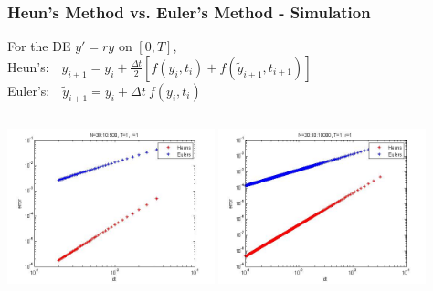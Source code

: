 \begin{frame}
   \frametitle{Heun's Method vs. Euler's Method - Simulation}
For the DE $y'=r y$ on $[0,T]$,\\
\vspace{1em}
		\hspace{1.5em} Heun's:$ \hspace{1em} y_{i+1} = y_i + \frac{\Delta t}{2} \left[f(y_i,t_i) + f(\tilde{y}_{i+1}, t_{i+1})\right]$ \vspace{1em} \\
	\hspace{1.5em} Euler's:$\hspace{1em}\tilde{y}_{i+1} = y_i + \Delta t \ f(y_i, t_i)$ \\
\begin{columns}[t]
    \includegraphics[width=6cm]{img/Heun500}
    \includegraphics[width=6cm]{img/Heun10000}
  \end{columns}

\end{frame}
